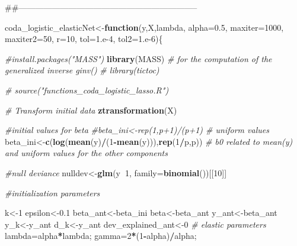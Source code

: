 \documentclass[]{book}
\newenvironment{Shaded}{\begin{snugshade}}{\end{snugshade}}
\newcommand{\KeywordTok}[1]{\textcolor[rgb]{0.13,0.29,0.53}{\textbf{#1}}}
\newcommand{\DataTypeTok}[1]{\textcolor[rgb]{0.13,0.29,0.53}{#1}}
\newcommand{\DecValTok}[1]{\textcolor[rgb]{0.00,0.00,0.81}{#1}}
\newcommand{\FloatTok}[1]{\textcolor[rgb]{0.00,0.00,0.81}{#1}}
\newcommand{\CommentTok}[1]{\textcolor[rgb]{0.56,0.35,0.01}{\textit{#1}}}
\newcommand{\ControlFlowTok}[1]{\textcolor[rgb]{0.13,0.29,0.53}{\textbf{#1}}}
\newcommand{\OperatorTok}[1]{\textcolor[rgb]{0.81,0.36,0.00}{\textbf{#1}}}
\newcommand{\NormalTok}[1]{#1}
\begin{document}
\begin{Shaded}
\begin{Highlighting}[]
\NormalTok{##-----------------------------------------------------------------}

\NormalTok{coda_logistic_elasticNet<-}\ControlFlowTok{function}\NormalTok{(y,X,lambda, }\DataTypeTok{alpha=}\FloatTok{0.5}\NormalTok{, }\DataTypeTok{maxiter=}\DecValTok{1000}\NormalTok{, }\DataTypeTok{maxiter2=}\DecValTok{50}\NormalTok{, }\DataTypeTok{r=}\DecValTok{10}\NormalTok{, }
                                   \DataTypeTok{tol=}\FloatTok{1.e-4}\NormalTok{, }\DataTypeTok{tol2=}\FloatTok{1.e-6}\NormalTok{)\{}
  
  \CommentTok{#install.packages("MASS")}
  \KeywordTok{library}\NormalTok{(MASS)   }\CommentTok{# for the computation of the generalized inverse ginv()}
\CommentTok{#  library(tictoc)}
  
\CommentTok{#  source("functions_coda_logistic_lasso.R") }
  
  \CommentTok{# Transform initial data }
  \KeywordTok{ztransformation}\NormalTok{(X)}
  
  \CommentTok{#initial values for beta}
  \CommentTok{#beta_ini<-rep(1,p+1)/(p+1)  # uniform values }
\NormalTok{  beta_ini<-}\KeywordTok{c}\NormalTok{(}\KeywordTok{log}\NormalTok{(}\KeywordTok{mean}\NormalTok{(y)}\OperatorTok{/}\NormalTok{(}\DecValTok{1}\OperatorTok{-}\KeywordTok{mean}\NormalTok{(y))),}\KeywordTok{rep}\NormalTok{(}\DecValTok{1}\OperatorTok{/}\NormalTok{p,p))   }\CommentTok{# b0 related to mean(y) and uniform values for the other components}
  
  \CommentTok{#null deviance}
\NormalTok{  nulldev<-}\KeywordTok{glm}\NormalTok{(y}\OperatorTok{~}\DecValTok{1}\NormalTok{, }\DataTypeTok{family=}\KeywordTok{binomial}\NormalTok{())[[}\DecValTok{10}\NormalTok{]]}
  
  
  
  
  
  \CommentTok{#initialization parameters}
  
\NormalTok{  k<-}\DecValTok{1}
\NormalTok{  epsilon<-}\FloatTok{0.1}
\NormalTok{  beta_ant<-beta_ini}
\NormalTok{  beta<-beta_ant}
\NormalTok{  y_ant<-beta_ant}
\NormalTok{  y_k<-y_ant}
\NormalTok{  d_k<-y_ant}
\NormalTok{  dev_explained_ant<-}\DecValTok{0}
  \CommentTok{# elastic parameters}
\NormalTok{  lambda=alpha}\OperatorTok{*}\NormalTok{lambda;}
\NormalTok{  gamma=}\DecValTok{2}\OperatorTok{*}\NormalTok{(}\DecValTok{1}\OperatorTok{-}\NormalTok{alpha)}\OperatorTok{/}\NormalTok{alpha;}
  

\end{Highlighting}
\end{Shaded}
\end{document}
